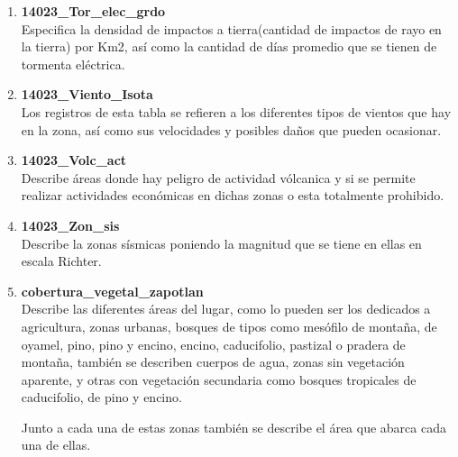\documentclass[10pt,letterpaper]{article}
\begin{document}
\begin{enumerate}
\item \textbf{14023\_Tor\_elec\_grdo}\\

Especifica la densidad de impactos a tierra(cantidad de impactos de rayo en la tierra) por Km2, as\'i como la cantidad de d\'ias promedio que se tienen de tormenta el\'ectrica.

\item \textbf{14023\_Viento\_Isota}\\

Los registros de esta tabla se refieren a los diferentes tipos de vientos que hay en la zona, as\'i como sus velocidades y posibles da\~nos que pueden ocasionar.

\item \textbf{14023\_Volc\_act}\\

Describe \'areas donde hay peligro de actividad v\'olcanica y si se permite realizar actividades econ\'omicas en dichas zonas o esta totalmente prohibido.

\item \textbf{14023\_Zon\_sis}\\

Describe la zonas s\'ismicas poniendo la magnitud que se tiene en ellas en escala Richter.

\item \textbf{cobertura\_vegetal\_zapotlan}\\

Describe las diferentes \'areas del lugar, como lo pueden ser los dedicados a agricultura, zonas urbanas, bosques de tipos como mes\'ofilo de montaña, de oyamel, pino, pino y encino, encino, caducifolio, pastizal o pradera de montaña, también se describen cuerpos de agua, zonas sin vegetaci\'on aparente, y otras con vegetaci\'on secundaria como bosques tropicales de caducifolio, de pino y encino.

Junto a cada una de estas zonas tambi\'en se describe el \'area que abarca cada una de ellas.

\end{enumerate}
\end{document}
